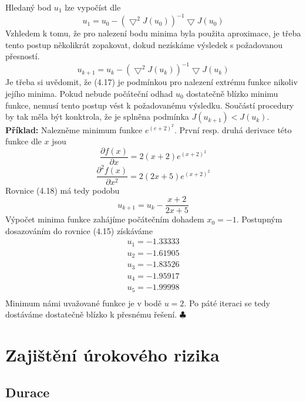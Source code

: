 \documentclass[a4paper]{book}
\begin{document}
Hledaný bod $u_1$ lze vypočíst dle
\begin{equation*}
u_1 = u_0 - (\bigtriangledown^2 J(u_0))^{-1} \bigtriangledown J(u_0) 
\end{equation*}
Vzhledem k tomu, že pro nalezení bodu minima byla použita aproximace, je třeba tento postup několikrát zopakovat, dokud nezískáme výsledek s požadovanou přesností.
\begin{equation}
u_{k+1} = u_k - (\bigtriangledown^2 J(u_k))^{-1} \bigtriangledown J(u_k) 
\end{equation}
Je třeba si uvědomit, že (4.17) je podmínkou pro nalezení extrému funkce nikoliv jejího minima. Pokud nebude počáteční odhad $u_0$ dostatečně blízko minimu funkce, nemusí tento postup vést k požadovanému výsledku. Součástí procedury by tak měla být konktrola, že je splněna podmínka $J(u_{k+1}) < J(u_k)$.\\

\noindent \textbf{Příklad:} Nalezněme minimum funkce $e^{(e+2)^2}$. První resp. druhá derivace této funkce dle $x$ jsou
\begin{equation*}
\frac{\partial f(x)}{\partial x} = 2(x+2)e^{(x+2)^2}
\end{equation*}
\begin{equation*}
\frac{\partial^2 f(x)}{\partial x^2} = 2(2x+5)e^{(x+2)^2}
\end{equation*}
Rovnice (4.18) má tedy podobu
\begin{equation}
u_{k+1} = u_k - \frac{x+2}{2x+5}
\end{equation}
Výpočet minima funkce zahájíme počátečním dohadem $x_0 = -1$. Postupným dosazováním do rovnice (4.15) získáváme
\begin{gather*}
u_1 = -1.33333 \\
u_2 = -1.61905 \\
u_3 = -1.83526 \\
u_4 = -1.95917 \\
u_5 = -1.99998 \\
\end{gather*}
Minimum námi uvažované funkce je v bodě $u = 2$. Po páté iteraci se tedy dostáváme dostatečně blízko k přesnému řešení. $\clubsuit$
\part{Zajištění úrokového rizika}

\chapter{Durace}
\end{document}
